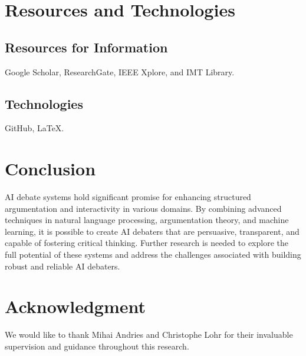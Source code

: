 \documentclass[conference]{IEEEtran}
\begin{document}
\section{Resources and Technologies}

\subsection{Resources for Information}
Google Scholar, ResearchGate, IEEE Xplore, and IMT Library.

\subsection{Technologies}
GitHub, LaTeX.

\section{Conclusion}
AI debate systems hold significant promise for enhancing structured argumentation and interactivity in various domains. By combining advanced techniques in natural language processing, argumentation theory, and machine learning, it is possible to create AI debaters that are persuasive, transparent, and capable of fostering critical thinking. Further research is needed to explore the full potential of these systems and address the challenges associated with building robust and reliable AI debaters.

\section*{Acknowledgment}
We would like to thank Mihai Andries and Christophe Lohr for their invaluable supervision and guidance throughout this research.
\end{document}
